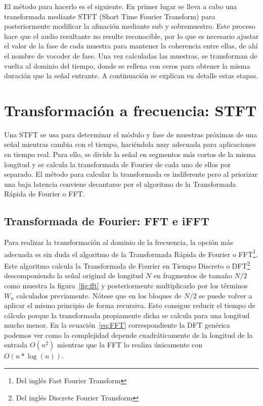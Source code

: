 El método para hacerlo es el siguiente. En primer lugar se lleva a cabo una transformada mediante STFT (Short Time Fourier Transform) para posteriormente modificar la afinación mediante sub y sobremuestro. Este proceso hace que el audio resultante no resulte reconocible, por lo que es necesario ajustar el valor de la fase de cada muestra para mantener la coherencia entre ellas, de ahí el nombre de vocoder de fase. Una vez calculadas las muestras, se transforman de vuelta al dominio del tiempo, donde se rellena con ceros para obtener la misma duración que la señal entrante. A continuación se explican en detalle estas etapas.

\section{Transformación a frecuencia: STFT}

Una STFT se usa para determinar el módulo y fase de muestras próximas de una señal mientras cambia con el tiempo, haciéndola muy adecuada para aplicaciones en tiempo real. Para ello, se divide la señal en segmentos más cortos de la misma longitud y se calcula la transformada de Fourier de cada uno de ellos por separado. El método para calcular la transformada es indiferente pero al priorizar una baja latencia conviene decantarse por el algoritmo de la Transformada Rápida de Fourier o FFT.

\subsection{Transformada de Fourier: FFT e iFFT}

Para realizar la transformación al dominio de la frecuencia, la opción más adecuada es sin duda el algoritmo de la Transformada Rápida de Fourier o FFT\footnote{Del inglés Fast Fourier Transform}. Este algoritmo calcula la Transformada de Fourier en Tiempo Discreto o DFT\footnote{Del inglés Discrete Fourier Transform} descomponiendo la señal original de longitud $N$ en fragmentos de tamaño $N/2$ como muestra la figura~\ref{fig:fft} y posteriormente multiplicarlo por los términos $W_{n}$ calculados previamente. Nótese que en los bloques de $N/2$ se puede volver a aplicar el mismo principio de forma recursiva. Esto consigue reducir el tiempo de cálculo porque la transformada propiamente dicha se calcula para una longitud mucho menor. En la ecuación~\ref{eq:FFT} correspondiente la DFT genérica podemos ver como la complejidad depende cuadráticamente de la longitud de la entrada $O({n^{2}})$ mientras que la FFT lo realiza únicamente con $O({n*\log (n)})$.

